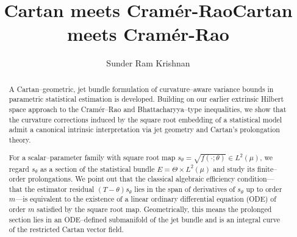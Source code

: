 \documentclass[3p,times]{elsarticle}
\begin{document}
\begin{frontmatter}


 \title{Cartan meets Cramér-Rao}
 \author{Sunder Ram Krishnan}
 \address{Department of Computer Science and Engineering,
Amrita Vishwa Vidyapeetham, Amritapuri, 690525, Kerala, India}

\dochead{}

\title{Cartan meets Cramér-Rao}


\author{}

\address{}

\begin{abstract}
A Cartan--geometric, jet bundle formulation of curvature--aware variance bounds in parametric statistical estimation is developed. Building on our earlier extrinsic Hilbert space approach to the Cramér--Rao and Bhattacharyya--type inequalities, we show that the curvature corrections induced by the square root embedding of a statistical model admit a canonical intrinsic interpretation via jet geometry and Cartan’s prolongation theory.

For a scalar--parameter family with square root map
\( s_\theta=\sqrt{f(\cdot;\theta)}\in L^2(\mu) \),
we regard \( s_\theta \) as a section of the statistical bundle
\( E=\Theta\times L^2(\mu) \) and study its finite--order prolongations.
We point out that the classical algebraic efficiency condition—that the estimator residual
\( (T-\theta)s_\theta \) lies in the span of derivatives of \( s_\theta \) up to order \( m \)—is equivalent to the existence of a linear ordinary differential equation (ODE) of order \( m \) satisfied by the square root map.
Geometrically, this means the prolonged section lies in an ODE--defined submanifold of the jet bundle and is an integral curve of the restricted Cartan vector field.


\end{abstract}
\end{frontmatter}
\end{document}
